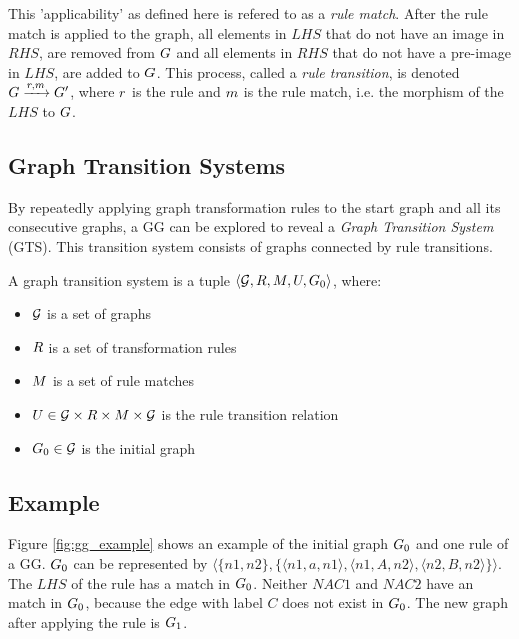 This 'applicability' as defined here is refered to as a \textit{rule match}. After the rule match is applied to the graph, all elements in $\mathit{LHS}$ that do not have an image in $\mathit{RHS}$, are removed from $G$ and all elements in $\mathit{RHS}$ that do not have a pre-image in $\mathit{LHS}$, are added to $G$. This process, called a \textit{rule transition}, is denoted $G \xrightarrow{r, m}G'$, where $r$ is the rule and $m$ is the rule match, i.e. the morphism of the $\mathit{LHS}$ to $G$.

\subsection{Graph Transition Systems}
By repeatedly applying graph transformation rules to the start graph and all its consecutive graphs, a GG can be explored to reveal a \textit{Graph Transition System} (GTS). This transition system consists of graphs connected by rule transitions.
\vspace{5px}
\begin{definition}
A graph transition system is a tuple	$\langle \mathcal{G}, R, M, U, G_0\rangle$, where:
\begin{itemize}
\item $\mathcal{G}$ is a set of graphs
\item $R$ is a set of transformation rules
\item $M$ is a set of rule matches
\item $U \in \mathcal{G} \times R \times M \times \mathcal{G}$ is the rule transition relation
\item $G_0 \in \mathcal{G}$ is the initial graph
\end{itemize}
\end{definition}

\subsection{Example}\label{sec:gts_example}
Figure \ref{fig:gg_example} shows an example of the initial graph $G_0$ and one rule of a GG. $G_0$ can be represented by $\langle\{n1,n2\},\{\langle n1,a,n1\rangle, \langle n1,A,n2\rangle,\langle n2,B,n2\rangle\}\rangle$. The $\mathit{LHS}$ of the rule has a match in $G_0$. Neither $\mathit{NAC1}$ and $\mathit{NAC2}$ have an match in $G_0$, because the edge with label $C$ does not exist in $G_0$. The new graph after applying the rule is $G_1$.

